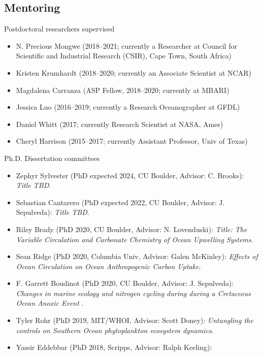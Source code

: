 \documentclass[11pt]{article}
\begin{document}
\subsection*{Mentoring}

\begin{description}[style=multiline,leftmargin=0.5cm,font=\normalfont]
\item Postdoctoral researchers supervised
	\begin{itemize}
	\item N. Precious Mongwe (2018--2021; currently a Researcher at Council for Scientific and Industrial Research (CSIR), Cape Town, South Africa)
	\item Kristen Krumhardt (2018--2020; currently an Associate Scientist at NCAR)
	\item Magdalena Carranza (ASP Fellow, 2018--2020; currently at MBARI)
	\item Jessica Luo (2016--2019; currently a Research Oceanographer at GFDL)
	\item Daniel Whitt (2017; currently Research Scientist at NASA, Ames)
	\item Cheryl Harrison (2015--2017; currently Assistant Professor, Univ of Texas)
	\end{itemize}
\item Ph.D. Dissertation committees
	\begin{itemize}
	\item Zephyr Sylvester (PhD expected 2024, CU Boulder, Advisor: C. Brooks): \textit{Title TBD}.
	\item Sebastian Cantarero (PhD expected 2022, CU Boulder, Advisor: J. Sepulveda): \textit{Title TBD}.
	\item Riley Brady (PhD 2020, CU Boulder, Advisor: N. Lovenduski): \textit{Title: The Variable Circulation and Carbonate Chemistry of Ocean Upwelling Systems}.
	\item Sean Ridge (PhD 2020, Columbia Univ, Advisor: Galen McKinley): \textit{Effects of Ocean Circulation on Ocean Anthropogenic Carbon Uptake}.
	\item F. Garrett Boudinot (PhD 2020, CU Boulder, Advisor: J. Sepulveda):
	\textit{Changes in marine ecology and nitrogen cycling during during a Cretaceous Ocean Anoxic Event }.
	\item Tyler Rohr (PhD 2019, MIT/WHOI, Advisor: Scott Doney):
	\textit{Untangling the controls on Southern Ocean phytoplankton ecosystem dynamics}.
	\item Yassir Eddebbar (PhD 2018, Scripps, Advisor: Ralph Keeling):

\end{itemize}
\end{description}
\end{document}
